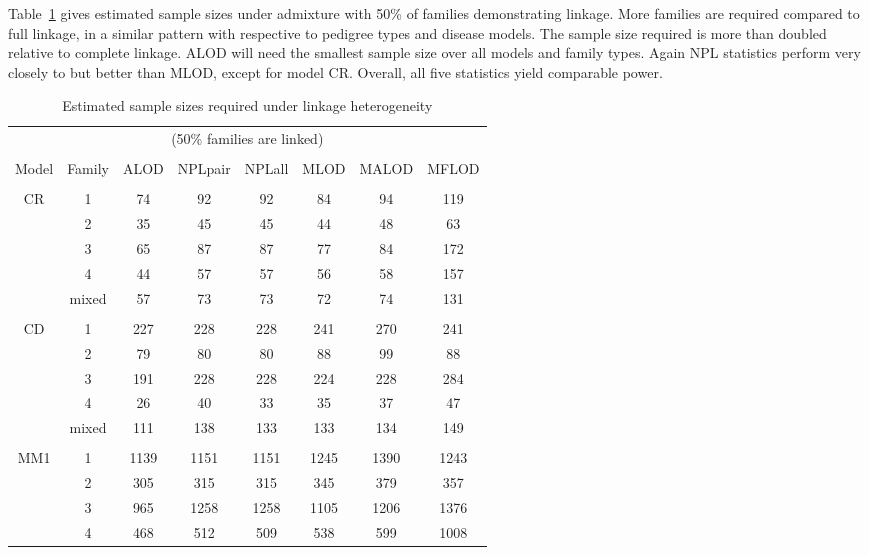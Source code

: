 Table~\ref{l50} gives estimated sample sizes under admixture with 50\% of
families demonstrating linkage.  More families are required compared to full
linkage, in a similar pattern with respective to pedigree types and disease
models.  The sample size required is more than doubled relative to complete
linkage.  ALOD will need the smallest sample size over all models and family
types.  Again NPL statistics perform very closely to but better than MLOD,
except for model CR.  Overall, all five statistics yield comparable power.

\begin{table}[h]
\caption{Estimated sample sizes required under linkage heterogeneity\label{l50}}
\centering
\begin{tabular}{cccccccc}
\multicolumn{8}{c}{(50\% families are linked)}\\
\\
\hline
Model&  Family &ALOD  & NPLpair& NPLall&  MLOD  & MALOD &  MFLOD\\
\hline
\\
CR   &  1      &74    & 92     & 92    &  84    & 94    &  119  \\
     &  2      &35    & 45     & 45    &  44    & 48    &  63   \\
     &  3      &65    & 87     & 87    &  77    & 84    &  172  \\
     &  4      &44    & 57     & 57    &  56    & 58    &  157  \\
     &mixed    &57    & 73     & 73    &  72    & 74    &  131  \\
\\
CD   &  1      &227   & 228    & 228   &  241   & 270   &  241  \\
     &  2      &79    & 80     & 80    &  88    & 99    &  88   \\
     &  3      &191   & 228    & 228   &  224   & 228   &  284  \\
     &  4      &26    & 40     & 33    &  35    & 37    &  47   \\
     &mixed    &111   & 138    & 133   &  133   & 134   &  149  \\
\\
MM1  &  1      &1139  & 1151   & 1151  &  1245  & 1390  &  1243 \\
     &  2      &305   & 315    & 315   &  345   & 379   &  357  \\
     &  3      &965   & 1258   & 1258  &  1105  & 1206  &  1376 \\
     &  4      &468   & 512    & 509   &  538   & 599   &  1008 \\

\end{tabular}
\end{table}
